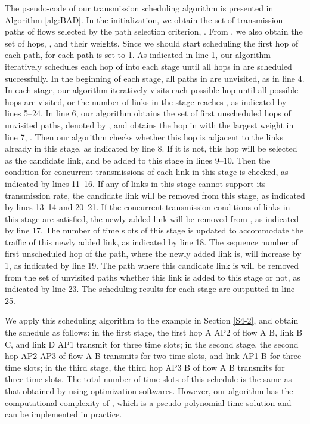 \documentclass[journal]{IEEEtran}
\begin{document}
The pseudo-code of our transmission scheduling algorithm is presented in Algorithm \ref{alg:BAD}.
In the initialization, we obtain the set of transmission paths of flows selected by the path selection criterion,
. From , we also obtain the set of hops, , and their weights. Since we should start
scheduling the first hop of each path,  for each path  is set to 1. As indicated in
line 1, our algorithm iteratively schedules each hop of  into each stage until all hops in 
are scheduled successfully. In the beginning of each stage, all paths in  are unvisited, as in
line 4. In each stage, our algorithm iteratively visits each possible hop until all possible hops
are visited, or the number of links in the stage reaches , as
indicated by lines 5--24. In line 6, our algorithm obtains the set of first unscheduled hops of unvisited
paths, denoted by , and obtains the hop in  with the largest weight in
line 7, . Then our algorithm checks whether this hop is adjacent to the links already in this stage,
as indicated by line 8. If it is not, this hop will be selected as the candidate link, and be added
to this stage in lines 9--10. Then the condition for concurrent transmissions of each link in this
stage is checked, as indicated by lines 11--16. If any of links in this stage cannot support its
transmission rate, the candidate link will be removed from this stage, as indicated by lines 13--14
and 20--21. If the concurrent transmission conditions of links in this stage are satisfied, the
newly added link will be removed from , as indicated by line 17. The number of time slots of
this stage is updated to accommodate the traffic of this newly added link, as indicated by line 18.
The sequence number of first unscheduled hop of the path, where the newly added link is, will
increase by 1, as indicated by line 19. The path where this candidate link is will be removed from
the set of unvisited paths whether this link is added to this stage or not, as indicated by line
23. The scheduling results for each stage are outputted in line 25.




We apply this scheduling algorithm to the example in Section \ref{S4-2}, and obtain the schedule as
follows: in the first stage, the first hop A  AP2 of flow A  B, link B  C, and link
D  AP1 transmit for three time slots; in the second stage, the second hop AP2  AP3 of
flow A  B transmits for two time slots, and link AP1  B for three time slots; in the
third stage, the third hop AP3  B of flow A  B transmits for three time slots. The total
number of time slots of this schedule is the same as that obtained by using optimization softwares.
However, our algorithm has the computational complexity of , which is a
pseudo-polynomial time solution and can be implemented in practice.
\end{document}
